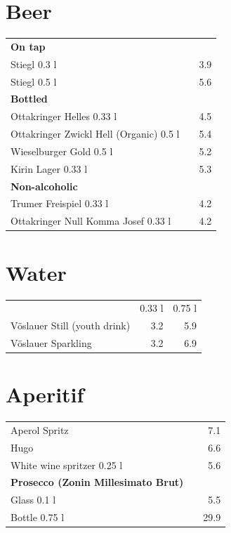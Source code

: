 \documentclass[a4paper,12pt]{article}
\begin{document}
\begin{multicols}{2}
\section*{Beer}
\begin{tabular}{Lrr}
\textbf{On tap}\\
\hspace{0.4cm}Stiegl 0.3 l & & 3.9\\
\hspace{0.4cm}Stiegl 0.5 l & & 5.6\vspace{0.1cm}\\
\textbf{Bottled}\\
\hspace{0.4cm}Ottakringer Helles 0.33 l & & 4.5\\
\hspace{0.4cm}Ottakringer Zwickl Hell (Organic) 0.5 l & & 5.4\\
\hspace{0.4cm}Wieselburger Gold 0.5 l & & 5.2\\
\hspace{0.4cm}Kirin Lager 0.33 l & & 5.3\vspace{0.1cm}\\
\textbf{Non-alcoholic}\\
\hspace{0.4cm}Trumer Freispiel 0.33 l & & 4.2\\
\hspace{0.4cm}Ottakringer Null Komma Josef 0.33 l & & 4.2
\end{tabular}

\columnbreak
\section*{Water}
\begin{tabular}{Lrr}
& 0.33 l & 0.75 l\\
Vöslauer Still (youth drink) & 3.2 & 5.9\\
Vöslauer Sparkling & 3.2 & 6.9
\end{tabular}

\section*{Aperitif}
\begin{tabular}{Lrr}
Aperol Spritz & & 7.1\\
Hugo & & 6.6\\
White wine spritzer 0.25 l & & 5.6\\
\textbf{Prosecco (Zonin Millesimato Brut)}\\
\hspace{0.4cm}Glass 0.1 l & & 5.5\\
\hspace{0.4cm}Bottle 0.75 l & & 29.9
\end{tabular}


\end{multicols}
\end{document}
